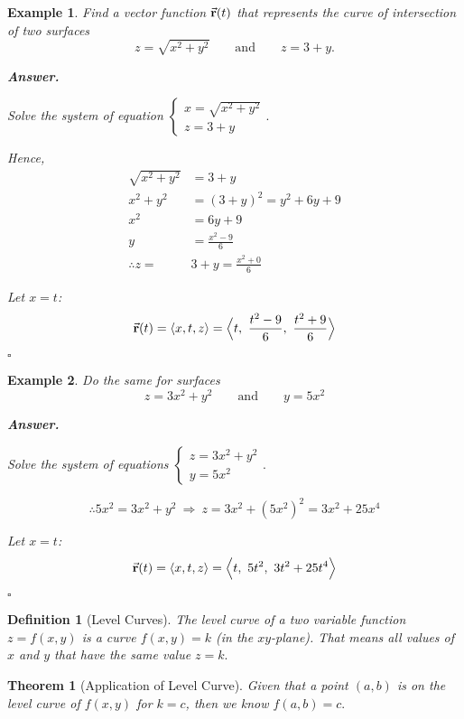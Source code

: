\documentclass[12pt,a4paper]{article}
\newtheorem{thm}{Theorem}[subsection]
\newtheorem{df}{Definition}[subsection]
\newtheorem{eg}{Example}[subsection]
\newenvironment*{ans}{\par\indent\textbf{\textit{Answer. }}\par}{\par\hfill{$\square$}\par}
\def\vecr{\va{{\textbf{r}}}}
\begin{document}
\begin{eg}
	Find a vector function $\vecr(t)$ that represents the curve of intersection of two surfaces\[z=\sqrt{x^2+y^2}\qquad\text{and}\qquad z=3+y.\]
	\begin{ans}
		Solve the system of equation $\begin{cases}x=\sqrt{x^2+y^2}\\z=3+y\end{cases}.$\par
		Hence, \[\begin{aligned}
			\sqrt{x^2+y^2}&=3+y\\
			x^2+y^2&=(3+y)^2=y^2+6y+9\\
			x^2&=6y+9\\
			y&=\frac{x^2-9}{6}\\
			\therefore z=&3+y=\frac{x^2+0}{6}
 		\end{aligned}\]\par 
 		Let $x=t$: \[\vecr(t)=\langle x,t,z\rangle=\Big\langle t,\ \frac{t^2-9}{6},\ \frac{t^2+9}{6}\Big\rangle\]
	\end{ans}
\end{eg}
\begin{eg}
	Do the same for surfaces\[z=3x^2+y^2\qquad\text{and}\qquad y=5x^2\]
	\begin{ans}
		Solve the system of equations $\begin{cases}z=3x^2+y^2\\y=5x^2\end{cases}.$\par
		\[\therefore 5x^2=3x^2+y^2\ \Longrightarrow\ z=3x^2+(5x^2)^2=3x^2+25x^4\]\par 
		Let $x=t$: \[\vecr(t)=\langle x,t,z\rangle=\Big\langle t,\ 5t^2,\ 3t^2+25t^4\Big\rangle\]	
	\end{ans}
\end{eg}
\begin{df}[Level Curves]
	The level curve of a two variable function $z=f(x,y)$ is a curve $f(x,y)=k$ (in the $xy$-plane). That means all values of $x$ and $y$ that have the same value $z=k.$
\end{df}
\begin{thm}[Application of Level Curve]
	Given that a point $(a,b)$ is on the level curve of $f(x,y)$ for $k=c$, then we know $f(a,b)=c.$	
\end{thm}
\end{document}
